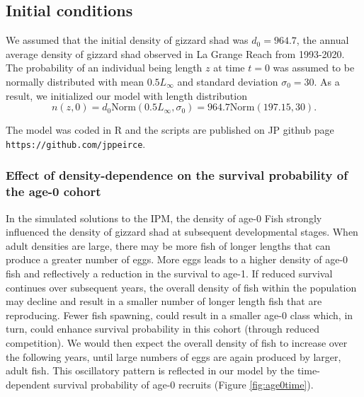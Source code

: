 \documentclass[preprint,review,12pt,authoryear]{elsarticle}
\begin{document}
\subsection{Initial conditions}  We assumed that the initial density of gizzard shad was $d_0 = 964.7$, the annual average density of gizzard shad observed in La Grange Reach from 1993-2020.  
The probability of an individual being length $z$ at time $t=0$  was assumed to be normally distributed with mean $0.5L_\infty$ and standard deviation $\sigma_0 = 30$.  
As a result, we initialized our model with length distribution
\begin{equation}\label{eq:n}
 n(z,0) = d_0 \mbox{Norm} (0.5 L_\infty, \sigma_0) = 964.7 \mbox{Norm} (197.15, 30). 
 \end{equation}

The model was coded in R \citep{R} and the scripts are published on JP github page \verb+https://github.com/jppeirce+.

\subsubsection{Effect of density-dependence on the survival probability of the age-0 cohort} \label{sec:survival}

In the simulated solutions to the IPM, the density of age-0 Fish strongly influenced the density of gizzard shad at subsequent developmental stages.
When adult densities are large, there may be more fish of longer lengths that can produce a greater number of eggs.  
More eggs leads to a higher density of age-0 fish and reflectively a reduction in the survival to age-1. 
If reduced survival continues over subsequent years, the overall density of fish within the population may decline and result in a smaller number of longer length fish that are reproducing.  
Fewer fish spawning, could result in a smaller age-0 class which, in turn, could enhance survival probability in this cohort (through reduced competition). 
We would then expect the overall density of fish to increase over the following years, until large numbers of eggs are again produced by larger, adult fish.  
This oscillatory pattern is reflected in our model by the time-dependent survival probability of age-0 recruits (Figure \ref{fig:age0time}).
\end{document}
